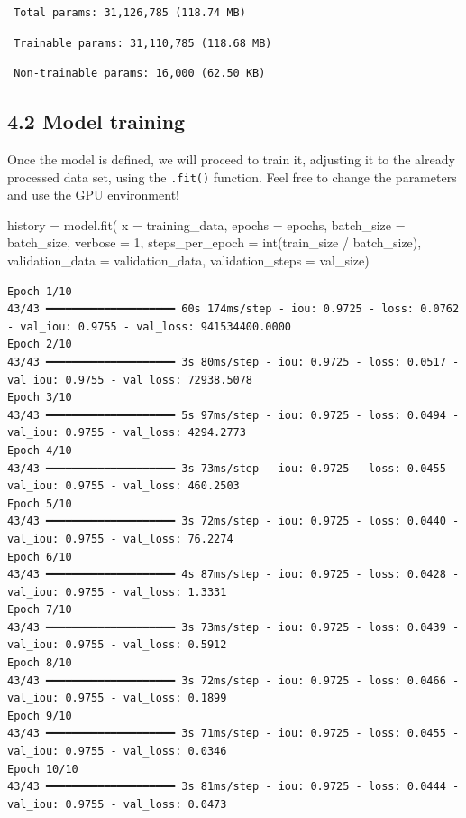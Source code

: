\documentclass[
  letterpaper,
  DIV=11,
  numbers=noendperiod]{scrreprt}
\newenvironment{Shaded}{\begin{snugshade}}{\end{snugshade}}
\newcommand{\BuiltInTok}[1]{\textcolor[rgb]{0.00,0.23,0.31}{#1}}
\newcommand{\DecValTok}[1]{\textcolor[rgb]{0.68,0.00,0.00}{#1}}
\newcommand{\NormalTok}[1]{\textcolor[rgb]{0.00,0.23,0.31}{#1}}
\newcommand{\OperatorTok}[1]{\textcolor[rgb]{0.37,0.37,0.37}{#1}}
\begin{document}
\begin{verbatim}
 Total params: 31,126,785 (118.74 MB)
\end{verbatim}

\begin{verbatim}
 Trainable params: 31,110,785 (118.68 MB)
\end{verbatim}

\begin{verbatim}
 Non-trainable params: 16,000 (62.50 KB)
\end{verbatim}

\subsection{4.2 Model training}\label{model-training}

Once the model is defined, we will proceed to train it, adjusting it to
the already processed data set, using the \texttt{.fit()} function. Feel
free to change the parameters and use the GPU environment!

\begin{Shaded}
\begin{Highlighting}[]
\NormalTok{history }\OperatorTok{=}\NormalTok{ model.fit(}
\NormalTok{    x }\OperatorTok{=}\NormalTok{ training\_data,}
\NormalTok{    epochs }\OperatorTok{=}\NormalTok{ epochs,}
\NormalTok{    batch\_size }\OperatorTok{=}\NormalTok{ batch\_size,}
\NormalTok{    verbose }\OperatorTok{=} \DecValTok{1}\NormalTok{,}
\NormalTok{    steps\_per\_epoch }\OperatorTok{=} \BuiltInTok{int}\NormalTok{(train\_size }\OperatorTok{/}\NormalTok{ batch\_size),}
\NormalTok{    validation\_data }\OperatorTok{=}\NormalTok{ validation\_data,}
\NormalTok{    validation\_steps }\OperatorTok{=}\NormalTok{ val\_size)}
\end{Highlighting}
\end{Shaded}

\begin{verbatim}
Epoch 1/10
43/43 ━━━━━━━━━━━━━━━━━━━━ 60s 174ms/step - iou: 0.9725 - loss: 0.0762 - val_iou: 0.9755 - val_loss: 941534400.0000
Epoch 2/10
43/43 ━━━━━━━━━━━━━━━━━━━━ 3s 80ms/step - iou: 0.9725 - loss: 0.0517 - val_iou: 0.9755 - val_loss: 72938.5078
Epoch 3/10
43/43 ━━━━━━━━━━━━━━━━━━━━ 5s 97ms/step - iou: 0.9725 - loss: 0.0494 - val_iou: 0.9755 - val_loss: 4294.2773
Epoch 4/10
43/43 ━━━━━━━━━━━━━━━━━━━━ 3s 73ms/step - iou: 0.9725 - loss: 0.0455 - val_iou: 0.9755 - val_loss: 460.2503
Epoch 5/10
43/43 ━━━━━━━━━━━━━━━━━━━━ 3s 72ms/step - iou: 0.9725 - loss: 0.0440 - val_iou: 0.9755 - val_loss: 76.2274
Epoch 6/10
43/43 ━━━━━━━━━━━━━━━━━━━━ 4s 87ms/step - iou: 0.9725 - loss: 0.0428 - val_iou: 0.9755 - val_loss: 1.3331
Epoch 7/10
43/43 ━━━━━━━━━━━━━━━━━━━━ 3s 73ms/step - iou: 0.9725 - loss: 0.0439 - val_iou: 0.9755 - val_loss: 0.5912
Epoch 8/10
43/43 ━━━━━━━━━━━━━━━━━━━━ 3s 72ms/step - iou: 0.9725 - loss: 0.0466 - val_iou: 0.9755 - val_loss: 0.1899
Epoch 9/10
43/43 ━━━━━━━━━━━━━━━━━━━━ 3s 71ms/step - iou: 0.9725 - loss: 0.0455 - val_iou: 0.9755 - val_loss: 0.0346
Epoch 10/10
43/43 ━━━━━━━━━━━━━━━━━━━━ 3s 81ms/step - iou: 0.9725 - loss: 0.0444 - val_iou: 0.9755 - val_loss: 0.0473
\end{verbatim}
\end{document}
